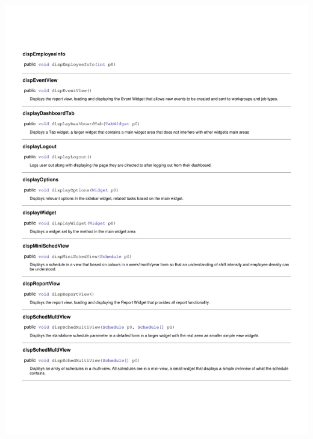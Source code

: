\documentclass[letterpaper,12pt]{report}
\begin{document}
\includegraphics[scale=0.9,trim=20mm 30mm 25mm 25mm]{externals/InterfaceDataDictionary2.pdf}
\newpage
\end{document}
